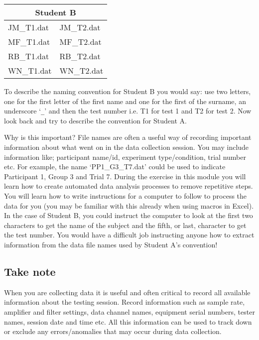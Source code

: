 \documentclass[12pt,a4paper]{article}
\begin{document}
\begin{table}[H]
  \begin{center}
    \begin{tabular}{|l|l|}
    \hline
    \multicolumn{2}{|c|}{Student B} \\
    \hline
    JM\_T1.dat & JM\_T2.dat \\
    \hline
    MF\_T1.dat & MF\_T2.dat \\
    \hline
    RB\_T1.dat & RB\_T2.dat \\
    \hline
    WN\_T1.dat & WN\_T2.dat \\
    \hline    
    \end{tabular}
  \end{center}
  \label{tab:namingconventionsb}
\end{table}

To describe the naming convention for Student B you would say: use two letters, one for the first letter of the first name and one for the first of the surname, an underscore `\verb|_|' and then the test number i.e. T1 for test 1 and T2 for test 2.  
Now look back and try to describe the convention for Student A.

Why is this important?  
File names are often a useful way of recording important information about what went on in the data collection session.  
You may include information like; participant name/id, experiment type/condition, trial number etc.  
For example, the name `PP1\_G3\_T7.dat' could be used to indicate Participant 1, Group 3 and Trial 7.  
During the exercise in this module you will learn how to create automated data analysis processes to remove repetitive steps.  
You will learn how to write instructions for a computer to follow to process the data for you (you may be familiar with this already when using macros in Excel).  
In the case of Student B, you could instruct the computer to look at the first two characters to get the name of the subject and the fifth, or last, character to get the test number.  
You would have a difficult job instructing anyone how to extract information from the data file names used by Student A's convention!

\subsection{Take note}
When you are collecting data it is useful and often critical to record all available information about the testing session.  
Record information such as sample rate, amplifier and filter settings, data channel names, equipment serial numbers, tester names, session date and time etc.  
All this information can be used to track down or exclude any errors/anomalies that may occur during data collection.
\end{document}
